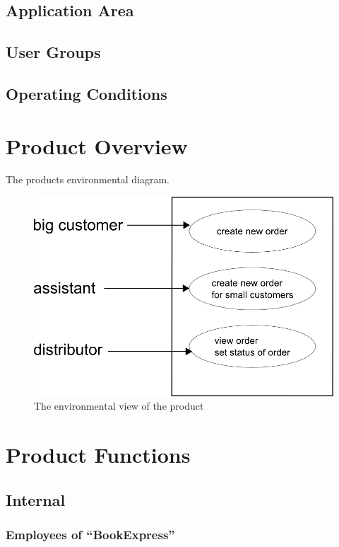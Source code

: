 \documentclass[11pt,a4paper,oneside,svgnames,draft]{report}
\begin{document}
\section{Application Area}
\section{User Groups}
\section{Operating Conditions}

\chapter{Product Overview}
The products environmental diagram.

\begin{figure}[h!]
 \begin{center}
  \includegraphics[scale=0.8]{images/umweltdiagramm.png}
 \end{center}
 \caption{The environmental view of the product}
\end{figure}


\chapter{Product Functions}

\section{Internal}
\subsection{Employees of ``BookExpress''}
\end{document}
